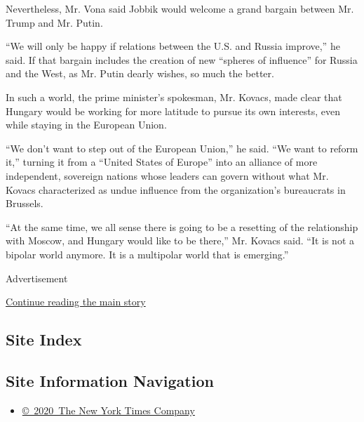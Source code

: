 Nevertheless, Mr. Vona said Jobbik would welcome a grand bargain between
Mr. Trump and Mr. Putin.

``We will only be happy if relations between the U.S. and Russia
improve,'' he said. If that bargain includes the creation of new
``spheres of influence'' for Russia and the West, as Mr. Putin dearly
wishes, so much the better.

In such a world, the prime minister's spokesman, Mr. Kovacs, made clear
that Hungary would be working for more latitude to pursue its own
interests, even while staying in the European Union.

``We don't want to step out of the European Union,'' he said. ``We want
to reform it,'' turning it from a ``United States of Europe'' into an
alliance of more independent, sovereign nations whose leaders can govern
without what Mr. Kovacs characterized as undue influence from the
organization's bureaucrats in Brussels.

``At the same time, we all sense there is going to be a resetting of the
relationship with Moscow, and Hungary would like to be there,'' Mr.
Kovacs said. ``It is not a bipolar world anymore. It is a multipolar
world that is emerging.''

Advertisement

\protect\hyperlink{after-bottom}{Continue reading the main story}

\hypertarget{site-index}{%
\subsection{Site Index}\label{site-index}}

\hypertarget{site-information-navigation}{%
\subsection{Site Information
Navigation}\label{site-information-navigation}}

\begin{itemize}
\tightlist
\item
  \href{https://help.nytimes.com/hc/en-us/articles/115014792127-Copyright-notice}{©~2020~The
  New York Times Company}
\end{itemize}

